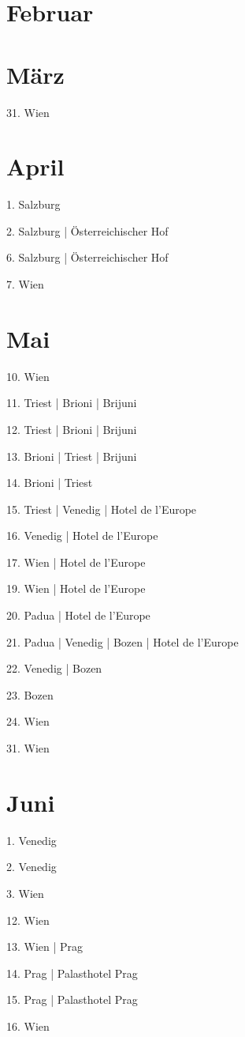 \documentclass[twoside=false,titlepage=false,open=any, parskip=never, fontsize=10pt, headings=small, chapterprefix=false, appendixprefix=false, DIV=15]{scrbook}
\begin{document}
\begin{multicols}{3}
            \section*{Februar}
            \section*{März}
            31. Wien\par
            \section*{April}
            1. Salzburg\par
            2. Salzburg | Österreichischer Hof\par
            6. Salzburg | Österreichischer Hof\par
            7. Wien\par
            \section*{Mai}
            10. Wien\par
            11. Triest | Brioni | Brijuni\par
            12. Triest | Brioni | Brijuni\par
            13. Brioni | Triest | Brijuni\par
            14. Brioni | Triest\par
            15. Triest | Venedig | Hotel de l’Europe\par
            16. Venedig | Hotel de l’Europe\par
            17. Wien | Hotel de l’Europe\par
            19. Wien | Hotel de l’Europe\par
            20. Padua | Hotel de l’Europe\par
            21. Padua | Venedig | Bozen | Hotel de l’Europe\par
            22. Venedig | Bozen\par
            23. Bozen\par
            24. Wien\par
            31. Wien\par
            \section*{Juni}
            1. Venedig\par
            2. Venedig\par
            3. Wien\par
            12. Wien\par
            13. Wien | Prag\par
            14. Prag | Palasthotel Prag\par
            15. Prag | Palasthotel Prag\par
            16. Wien\par

\end{multicols}
\end{document}
